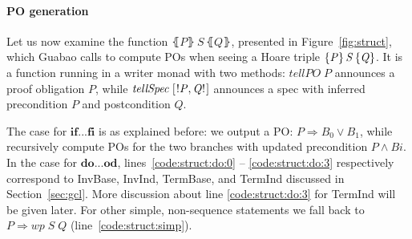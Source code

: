 \documentclass[runningheads]{llncs}
\newcommand{\Conid}[1]{\mathit{#1}}
\newcommand{\Varid}[1]{\mathit{#1}}
\let\Varid\mathit
\let\Conid\mathit
\begin{document}
\paragraph{PO generation}
Let us now examine the function \ensuremath{\lBrace\Conid{P}\rBrace\,\Conid{S}\,\lBrace\Conid{Q}\rBrace}, presented in Figure~\ref{fig:struct}, which Guabao calls to compute POs when seeing a Hoare triple \ensuremath{\htriple{\Conid{P}}{\Conid{S}}{\Conid{Q}}}.
It is a function running in a writer monad with two methods:
\ensuremath{\Varid{tellPO}\;\Conid{P}} announces a proof obligation \ensuremath{\Conid{P}}, while \ensuremath{\Varid{tellSpec}\;[\mskip1.5mu \mathbin{!}\Conid{P},\Conid{Q}\mathbin{!}\mskip1.5mu]} announces a spec with inferred precondition \ensuremath{\Conid{P}} and postcondition \ensuremath{\Conid{Q}}.

The case for \ensuremath{\mathbf{if}\mathbin{...}\mathbf{fi}} is as explained before:
we output a PO: \ensuremath{\Conid{P}\mathrel{\Rightarrow}\Conid{B}_{0}\mathrel{\vee}\Conid{B}_{1}}, while recursively compute POs for the two branches with updated precondition \ensuremath{\Conid{P}\mathrel{\wedge}\Conid{Bi}}.
In the case for \ensuremath{\mathbf{do}\mathbin{...}\mathbf{od}},
lines~\ref{code:struct:do:0} -- \ref{code:struct:do:3}
respectively correspond to {\sf InvBase}, {\sf InvInd}, {\sf TermBase}, and {\sf TermInd} discussed in Section~\ref{sec:gcl}.
More discussion about line \ref{code:struct:do:3} for {\sf TermInd} will be given later.
For other simple, non-sequence statements we fall back to \ensuremath{\Conid{P}\mathrel{\Rightarrow}\Varid{wp}\;\Conid{S}\;\Conid{Q}} (line~\ref{code:struct:simp}).
\end{document}
